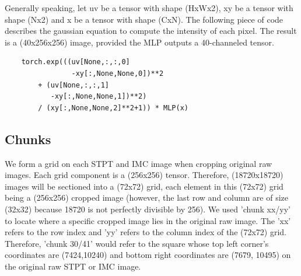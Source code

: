 \documentclass[10pt,twocolumn,letterpaper]{article}
\begin{document}
Generally speaking, let uv be a tensor with shape (HxWx2), xy be a tensor with shape (Nx2) and x be a tensor with shape (CxN). The following piece of code describes the gaussian equation to compute the intensity of each pixel. The result is a (40x256x256) image, provided the MLP outputs a 40-channeled tensor.

\begin{verbatim}
	torch.exp(((uv[None,:,:,0]
	            -xy[:,None,None,0])**2
	    + (uv[None,:,:,1]
	       -xy[:,None,None,1])**2)
	    / (xy[:,None,None,2]**2+1)) * MLP(x)
\end{verbatim}

\subsection{Chunks}
We form a grid on each STPT and IMC image when cropping original raw images. Each grid component is a (256x256) tensor. Therefore, (18720x18720) images will be sectioned into a (72x72) grid, each element in this (72x72) grid being a (256x256) cropped image (however, the last row and column are of size (32x32) because 18720 is not perfectly divisible by 256). We used 'chunk xx/yy' to locate where a specific cropped image lies in the original raw image. The 'xx' refers to the row index and 'yy' refers to the column index of the (72x72) grid. Therefore, 'chunk 30/41' would refer to the square whose top left corner's coordinates are (7424,10240) and bottom right coordinates are (7679, 10495) on the original raw STPT or IMC image.



{\small


}
\end{document}
